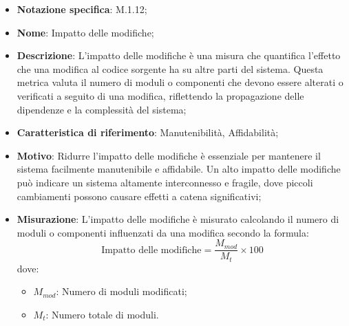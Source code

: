\begin{itemize}
    \item \textbf{Notazione specifica}: M.1.12;
    \item \textbf{Nome}: Impatto delle modifiche;
    \item \textbf{Descrizione}: L'impatto delle modifiche è una misura che quantifica l'effetto che una modifica al codice sorgente ha su altre parti del sistema. Questa metrica valuta il numero di moduli o componenti che devono essere alterati o verificati a seguito di una modifica, riflettendo la propagazione delle dipendenze e la complessità del sistema;
    \item \textbf{Caratteristica di riferimento}: Manutenibilità, Affidabilità;
    \item \textbf{Motivo}: Ridurre l'impatto delle modifiche è essenziale per mantenere il sistema facilmente manutenibile e affidabile. Un alto impatto delle modifiche può indicare un sistema altamente interconnesso e fragile, dove piccoli cambiamenti possono causare effetti a catena significativi;
    \item \textbf{Misurazione}: L'impatto delle modifiche è misurato calcolando il numero di moduli o componenti influenzati da una modifica secondo la formula: 
    \[
    \text{Impatto delle modifiche} = \frac{M_{mod}}{M_{t}} \times 100
    \]
    dove:
    \begin{itemize}
        \item $M_{mod}$: Numero di moduli modificati;
        \item $M_{t}$: Numero totale di moduli.
    \end{itemize}
    
\end{itemize}
